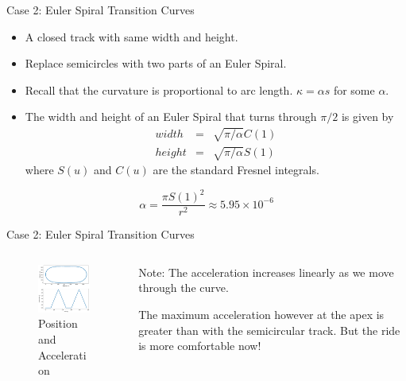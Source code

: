 \documentclass{beamer}
\begin{document}
\begin{frame}{Case 2: Euler Spiral Transition Curves}
	\begin{itemize}
		\item A closed track with same width and height. 
		\item Replace semicircles with two parts of an Euler Spiral.
		\item Recall that the curvature is proportional to arc length. $\kappa = \alpha s $ for some $\alpha$.
		\item The width and height of an Euler Spiral that turns through $\pi/2$ is given by 
		\begin{eqnarray*}
			width &=& \sqrt{\pi / \alpha} C(1) \\
			height &=& \sqrt{\pi /\alpha}S(1)
		\end{eqnarray*}
		where $S(u)$ and $C(u)$ are the standard Fresnel integrals.
	
	\end{itemize}
	
	\[
	\alpha = \frac{\pi S(1)^2}{r^2} \approx 5.95 \times 10 ^{-6}
	\]
	
\end{frame}

\begin{frame}{Case 2: Euler Spiral Transition Curves}
	\begin{columns}
		\begin{column}{0.8\textwidth}			
			\begin{figure}
				\caption{Position and Acceleration}
				\centering
				\includegraphics[width=70mm, scale=0.2]{euler_track.png}
			\end{figure}
		\end{column}
		\begin{column}{0.33\textwidth}
			Note: The acceleration increases linearly as we move through the curve.
			
			The maximum acceleration however at the apex is greater than with the semicircular track. But the ride is more comfortable now!
					
		\end{column}
	\end{columns}

\end{frame}
\end{document}
